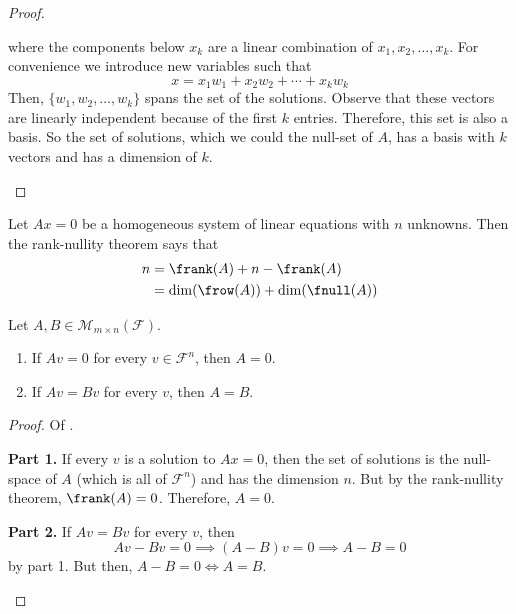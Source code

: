 \begin{proof}
\begin{flushleft}
		where the components below $x_k$ are a linear combination of $x_1,x_2,\dots,x_k$.
		For convenience we introduce new variables such that
		\begin{equation*}
			x = x_1w_1 + x_2w_2 + \cdots + x_kw_k
		\end{equation*}
		Then, $\{w_1,w_2,\dots,w_k\}$ spans the set of the solutions. Observe that
		these vectors are linearly independent because of the first $k$ entries.
		Therefore, this set is also a basis. So the set of solutions, which we could
		the null-set of $A$, has a basis with $k$ vectors and has a dimension of $k$.
	\end{flushleft}
\end{proof}

\begin{crl}\label{thm-rank-nullity-theorem}
	Let $Ax=0$ be a homogeneous system of linear equations with $n$ unknowns. Then
	the rank-nullity theorem says that
	\begin{align}
		n & = \frank(A) + n-\frank(A)\nonumber \\
		  & = \dim(\frow(A)) + \dim(\fnull(A))
	\end{align}
\end{crl}

\begin{thm}\label{thm-lin-system-properties}
	Let $A,B\in\mathcal{M}_{m\times n}(\mathcal{F})$.
	\begin{enumerate}
		\item If $Av=0$ for every $v\in\mathcal{F}^n$, then $A=0$.
		\item If $Av=Bv$ for every $v$, then $A=B$.
	\end{enumerate}
\end{thm}

\begin{proof}
	Of .
	\begin{flushleft}
		\textbf{Part 1.} If every $v$ is a solution to $Ax=0$, then the set of solutions
		is the null-space of $A$ (which is all of $\mathcal{F}^n$) and has the dimension
		$n$. But by the rank-nullity theorem, $\frank(A)=0$. Therefore, $A=0$.
	\end{flushleft}
	\begin{flushleft}
		\textbf{Part 2.}  If $Av=Bv$ for every $v$, then
		\begin{equation*}
			Av-Bv=0 \implies (A-B)v=0 \implies A-B=0
		\end{equation*}
		by part 1. But then, $A-B=0 \Leftrightarrow A=B$.
	\end{flushleft}
\end{proof}
